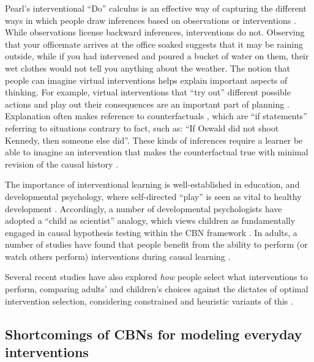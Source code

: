 \documentclass{cambridge7A}%
\begin{document}
Pearl's interventional ``Do'' calculus is an effective way of capturing the different ways in which people draw inferences based on observations or interventions \citep{sloman2005do,waldmann2005seeing}. While observations license backward inferences, interventions do not. Observing that your officemate arrives at the office soaked suggests that it may be raining outside, while if you had intervened and poured a bucket of water on them, their wet clothes would not tell you anything about the weather.  The notion that people can imagine virtual interventions helps explain important aspects of thinking.  For example, virtual interventions that ``try out'' different possible actions and play out their consequences are an important part of planning \citep{pfeiffer2013hippocampal,bramley2017phd}.  Explanation often makes reference to counterfactuals \citep{lagnado2013causal,rips2013inference,rips2010two,lucas2015improved,gerstenberg2015how}, which are ``if statements'' referring to situations contrary to fact, such as: ``If Oswald did not shoot Kennedy, then someone else did''.  These kinds of inferences require a learner be able to imagine an intervention that makes the counterfactual true with minimal revision of the causal history \citep{gerstenberg2013back,rips2010two,lagnado2013causal}. 

The importance of interventional learning is well-established in education, and developmental psychology, where self-directed ``play'' is seen as vital to healthy development \citep[e.g.][]{piaget1930child, bruner1976play}.  Accordingly, a number of developmental psychologists have adopted a ``child as scientist'' analogy, which views children as fundamentally engaged in causal hypothesis testing within the CBN framework \citep{gopnik2000detecting,gopnik2004maps,sobel2006importance,mccormack2016children}.  In adults, a number of studies have found that people benefit from the ability to perform (or watch others perform) interventions during causal learning \citep{lagnado2002learning, lagnado2006time, lagnado2004advantage, schulz2001do, sobel2006importance}. 

Several recent studies have also explored \emph{how} people select what interventions to perform, comparing adults' and children's choices against the dictates of optimal intervention selection,  considering constrained and heuristic variants of this \citep{bramley2015fcs,bramley2017neurath,mccormack2016children,coenen2015strategies,steyvers2003intervention}.

\subsection{Shortcomings of CBNs for modeling everyday interventions}
\end{document}
